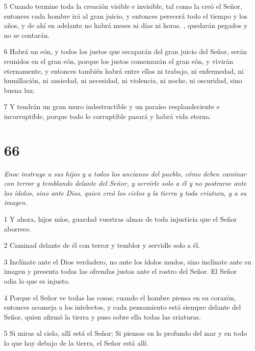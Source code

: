 \par 5 Cuando termine toda la creación visible e invisible, tal como la creó el Señor, entonces cada hombre irá al gran juicio, y entonces perecerá todo el tiempo y los años, y de ahí en adelante no habrá meses ni días ni horas. , quedarán pegados y no se contarán.

\par 6 Habrá un eón, y todos los justos que escaparán del gran juicio del Señor, serán reunidos en el gran eón, porque los justos comenzarán el gran eón, y vivirán eternamente, y entonces también habrá entre ellos ni trabajo, ni enfermedad, ni humillación, ni ansiedad, ni necesidad, ni violencia, ni noche, ni oscuridad, sino buena luz.

\par 7 Y tendrán un gran muro indestructible y un paraíso resplandeciente e incorruptible, porque todo lo corruptible pasará y habrá vida eterna.

\chapter{66}

\par \textit{Enoc instruye a sus hijos y a todos los ancianos del pueblo, cómo deben caminar con terror y temblando delante del Señor, y servirle solo a él y no postrarse ante los ídolos, sino ante Dios, quien creó los cielos y la tierra y toda criatura, y a su imagen.}

\par 1 Y ahora, hijos míos, guardad vuestras almas de toda injusticia que el Señor aborrece.

\par 2 Caminad delante de él con terror y temblor y servidle solo a él.

\par 3 Inclínate ante el Dios verdadero, no ante los ídolos mudos, sino inclínate ante su imagen y presenta todas las ofrendas justas ante el rostro del Señor. El Señor odia lo que es injusto.

\par 4 Porque el Señor ve todas las cosas; cuando el hombre piensa en su corazón, entonces aconseja a los intelectos, y cada pensamiento está siempre delante del Señor, quien afirmó la tierra y puso sobre ella todas las criaturas.

\par 5 Si miras al cielo, allí está el Señor; Si piensas en lo profundo del mar y en todo lo que hay debajo de la tierra, el Señor está allí.

